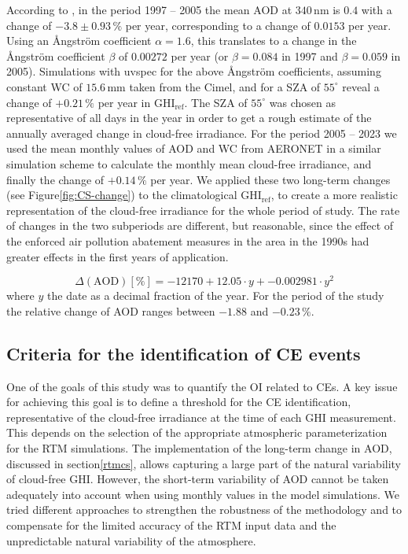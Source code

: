 \documentclass[preprint, 5p,
authoryear]{elsarticle} %
\begin{document}
According to \citet{Kazadzis2007}, in the period 1997 -- 2005 the mean
AOD at \(340\,\text{nm}\) is \(0.4\) with a change of
\(-3.8\pm0.93\,\%\) per year, corresponding to a change of \(0.0153\)
per year. Using an Ångström coefficient \(\alpha = 1.6\), this
translates to a change in the Ångström coefficient \(\beta\) of
\(0.00272\) per year (or \(\beta=0.084\) in 1997 and \(\beta=0.059\) in
2005). Simulations with uvspec for the above Ångström coefficients,
assuming constant WC of \(15.6\,\text{mm}\) taken from the Cimel, and
for a SZA of \(55^\circ\) reveal a change of \(+0.21\,\%\) per year in
\(\text{GHI}_\text{ref}\). The SZA of \(55^\circ\) was chosen as
representative of all days in the year in order to get a rough estimate
of the annually averaged change in cloud-free irradiance. For the period
2005 -- 2023 we used the mean monthly values of AOD and WC from AERONET
in a similar simulation scheme to calculate the monthly mean cloud-free
irradiance, and finally the change of \(+0.14\,\%\) per year. We applied
these two long-term changes (see
Figure\nobreakspace{}\ref{fig:CS-change}) to the climatological
\(\text{GHI}_\text{ref}\), to create a more realistic representation of
the cloud-free irradiance for the whole period of study. The rate of
changes in the two subperiods are different, but reasonable, since the
effect of the enforced air pollution abatement measures in the area in
the 1990s had greater effects in the first years of application.

\begin{equation}
\Delta(\text{AOD}) [\%] = -12170 + 12.05 \cdot y + -0.002981 \cdot y^2 \label{eq:AODchange}
\end{equation} where \(y\) the date as a decimal fraction of the year.
For the period of the study the relative change of AOD ranges between
\(-1.88\) and \(-0.23\,\%\).

\hypertarget{criteria-for-the-identification-of-ce-events}{%
\subsection{Criteria for the identification of CE
events}\label{criteria-for-the-identification-of-ce-events}}

One of the goals of this study was to quantify the OI related to CEs. A
key issue for achieving this goal is to define a threshold for the CE
identification, representative of the cloud-free irradiance at the time
of each GHI measurement. This depends on the selection of the
appropriate atmospheric parameterization for the RTM simulations. The
implementation of the long-term change in AOD, discussed in
section\nobreakspace{}\ref{rtmcs}, allows capturing a large part of the
natural variability of cloud-free GHI. However, the short-term
variability of AOD cannot be taken adequately into account when using
monthly values in the model simulations. We tried different approaches
to strengthen the robustness of the methodology and to compensate for
the limited accuracy of the RTM input data and the unpredictable natural
variability of the atmosphere.
\end{document}
